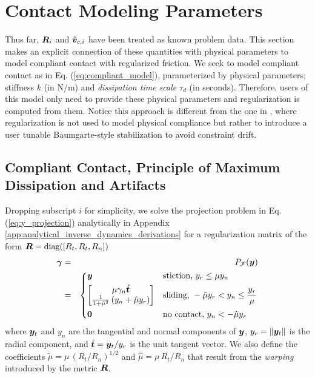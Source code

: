 \section{Contact Modeling Parameters}
\label{sec:contact_modeling_parameters}

Thus far, ${\bm{R}}_i$ and $\hat{{\bm{v}}}_{c,i}$ have been treated as known problem
data. This section makes an explicit connection of these quantities with
physical parameters to model compliant contact with regularized friction. We
seek to model compliant contact as in Eq. (\ref{eq:compliant_model}),
parameterized by physical parameters; stiffness $k$ (in N/m) and
\textit{dissipation time scale} $\tau_d$ (in seconds). Therefore, users of this
model only need to provide these physical parameters and regularization is
computed from them. Notice this approach is different from the one in
\cite{bib:todorov2014}, where regularization is not used to model physical
compliance but rather to introduce a user tunable Baumgarte-style stabilization
to avoid constraint drift. 

\subsection{Compliant Contact, Principle of Maximum Dissipation and Artifacts}
\label{sec:physical_intuition}

Dropping subscript $i$ for simplicity, we solve the projection problem in Eq.
(\ref{eq:y_projection}) analytically in Appendix
\ref{app:analytical_inverse_dynamics_derivations} for a regularization matrix of
the form ${\bm{R}} = \text{diag}([R_t, R_t, R_n])$
\begin{eqnarray}
	\bgamma &=& P_\mathcal{F}(\vf{y}) \label{eq:analytical_y_projection}\\
    &=&\begin{dcases}
	\vf{y} 
	& \text{stiction, } y_r \le \mu y_n\\
	\begin{bmatrix}
		\mu\gamma_n\hat{\vf{t}}\\
		\frac{1}{1+\tilde\mu^2}\left(y_n + \hat\mu y_r\right)
	\end{bmatrix}
	& \text{sliding, } -\hat\mu y_r < y_n \leq \frac{y_r}{\mu}\\
    \vf{0} & \text{no contact, } y_n < -\hat\mu y_r \end{dcases}\nonumber	
\end{eqnarray}
where ${\bm{y}}_t$ and $y_n$ are the tangential and normal components of ${\bm{y}}$,
$y_r=\Vert{\bm{y}}_t\Vert$ is the radial component, and
$\hat{{\bm{t}}}={\bm{y}}_t/y_r$ is the unit tangent vector. We also define the
coefficients $\tilde\mu=\mu\,(R_t/R_n)^{1/2}$ and $\hat\mu=\mu\,R_t/R_n$ that
result from the \textit{warping} introduced by the metric ${\bm{R}}$.

